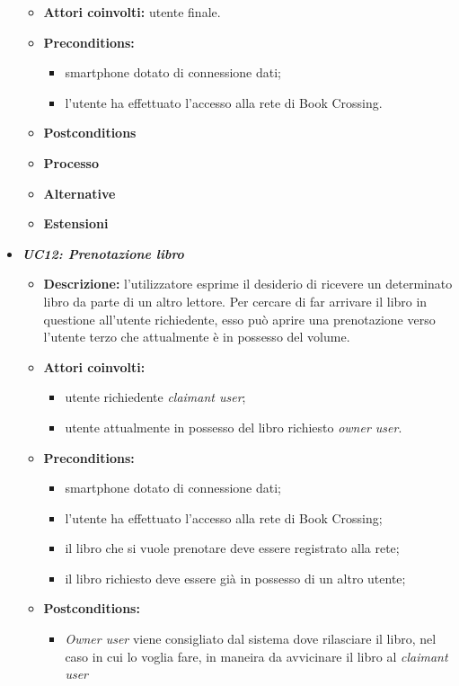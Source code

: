 \begin{itemize}
\begin{itemize}
		\item \textbf{Attori coinvolti:} utente finale.
		\item \textbf{Preconditions:}
		\begin{itemize}
			\item smartphone dotato di connessione dati;
			\item l’utente ha effettuato l’accesso alla rete di Book Crossing.
		\end{itemize}
		\item \textbf{Postconditions}
		\item \textbf{Processo}
		\item \textbf{Alternative}
		\item \textbf{Estensioni}
	\end{itemize}
	\item \textbf{\textit{UC12: Prenotazione libro}}
	\begin{itemize}
		\item \textbf{Descrizione:} l'utilizzatore esprime il desiderio di ricevere un determinato libro da parte di un altro lettore. Per cercare di far arrivare il libro in questione all'utente richiedente, esso può aprire una prenotazione verso l'utente terzo che attualmente è in possesso del volume.
		\item \textbf{Attori coinvolti:} 
		\begin{itemize}
			\item utente richiedente \textit{claimant user};
			\item utente attualmente in possesso del libro richiesto \textit{owner user}.
		\end{itemize}
		\item \textbf{Preconditions:}
		\begin{itemize}
			\item smartphone dotato di connessione dati;
			\item l’utente ha effettuato l’accesso alla rete di Book Crossing;
			\item il libro che si vuole prenotare deve essere registrato alla rete;
			\item il libro richiesto deve essere già in possesso di un altro utente;
		\end{itemize}
		\item \textbf{Postconditions:}
		\begin{itemize}
			\item \textit{Owner user} viene consigliato dal sistema dove rilasciare il libro, nel caso in cui lo voglia fare, in maneira da avvicinare il libro al \textit{claimant user}

\end{itemize}
\end{itemize}
\end{itemize}
